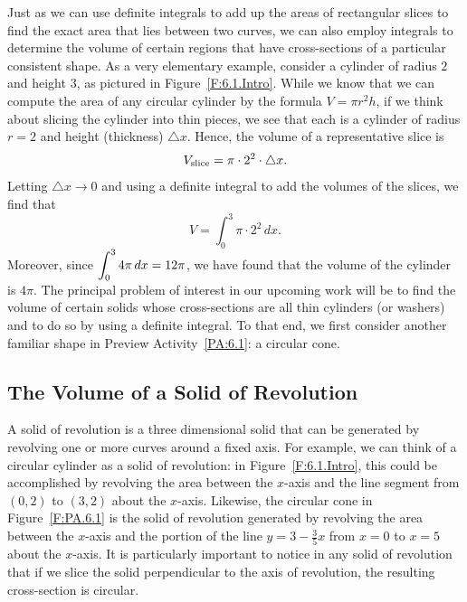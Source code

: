 Just as we can use definite integrals to add up the areas of rectangular slices to find the exact area that lies between two curves, we can also employ integrals to determine the volume of certain regions that have cross-sections of a particular consistent shape.  As a very elementary example, consider a cylinder of radius $2$ and height $3$, as pictured in Figure~\ref{F:6.1.Intro}.  While we know that we can compute the area of any circular cylinder by the formula $V = \pi r^2 h$, if we think about slicing the cylinder into thin pieces, we see that each is a cylinder of radius $r = 2$ and height (thickness) $\triangle x$.  Hence, the volume of a representative slice is
$$V_{\small{\text{slice}}} = \pi \cdot 2^2 \cdot \triangle x.$$
Letting $\triangle x \to 0$ and using a definite integral to add the volumes of the slices, we find that 
$$V = \int_0^3 \pi \cdot 2^2 \, dx.$$
Moreover, since $\displaystyle\int_0^3 4\pi \, dx = 12\pi$, we have found that the volume of the cylinder is $4\pi$.  The principal problem of interest in our upcoming work will be to find the volume of certain solids whose cross-sections are all thin cylinders (or washers) and to do so by using a definite integral.  To that end, we first consider another familiar shape in Preview Activity~\ref{PA:6.1}: a circular cone.


\subsection*{The Volume of a Solid of Revolution} 

A solid of revolution is a three dimensional solid that can be generated by revolving one or more curves around a fixed axis.  For example, we can think of a circular cylinder as a solid of revolution:  in Figure~\ref{F:6.1.Intro}, this could be accomplished by revolving the area between the $x$-axis and the line segment from $(0,2)$ to $(3,2)$ about the $x$-axis.  Likewise, the circular cone in Figure~\ref{F:PA.6.1} is the solid of revolution generated by revolving the area between the $x$-axis and the portion of the line $y = 3 - \frac{3}{5}x$ from $x = 0$ to $x = 5$ about the $x$-axis.  It is particularly important to notice in any solid of revolution that if we slice the solid perpendicular to the axis of revolution, the resulting cross-section is circular.

